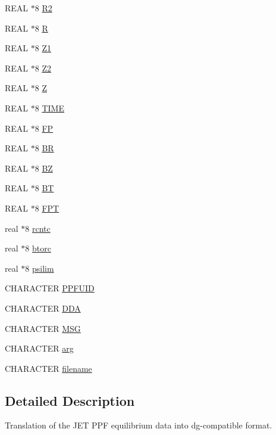 \begin{CompactItemize}
\item 
REAL $\ast$8 \hyperlink{namespaceJETPPF2DG_737ed75dab8a61babe35ac43c0a217e2}{R2}
\item 
REAL $\ast$8 \hyperlink{namespaceJETPPF2DG_e8aae9ece2ea51185b537f3815875dbe}{R}
\item 
REAL $\ast$8 \hyperlink{namespaceJETPPF2DG_b51d877f8345dc64e86952fa279daa83}{Z1}
\item 
REAL $\ast$8 \hyperlink{namespaceJETPPF2DG_dc17956d43608921538c64177125e1c4}{Z2}
\item 
REAL $\ast$8 \hyperlink{namespaceJETPPF2DG_e77dc9f382919eb823a6a004b79dec10}{Z}
\item 
REAL $\ast$8 \hyperlink{namespaceJETPPF2DG_c9078c3f7f6a9052eb87d78ea959db39}{TIME}
\item 
REAL $\ast$8 \hyperlink{namespaceJETPPF2DG_049a0aaf18dbe2243eb88e6b3098e4d3}{FP}
\item 
REAL $\ast$8 \hyperlink{namespaceJETPPF2DG_e35362876d621deef2d3119b6bec9e86}{BR}
\item 
REAL $\ast$8 \hyperlink{namespaceJETPPF2DG_caf852e3dca62b109e51b850e9a30668}{BZ}
\item 
REAL $\ast$8 \hyperlink{namespaceJETPPF2DG_1f8b39341692faac86ea6fbb52b03493}{BT}
\item 
REAL $\ast$8 \hyperlink{namespaceJETPPF2DG_697e63ef731b230d271dcbe3e66f07b2}{FPT}
\item 
real $\ast$8 \hyperlink{namespaceJETPPF2DG_be3c9bcf4058d9ec55ba6288bdef97fb}{rcntc}
\item 
real $\ast$8 \hyperlink{namespaceJETPPF2DG_b68b36ffa6613e3d1a69d435b2b5aaea}{btorc}
\item 
real $\ast$8 \hyperlink{namespaceJETPPF2DG_35264362cd8206b3671ba0049d7b3d5f}{psilim}
\item 
CHARACTER \hyperlink{namespaceJETPPF2DG_48577f770d2731f2e0b6560b4098131b}{PPFUID}
\item 
CHARACTER \hyperlink{namespaceJETPPF2DG_755c2f476cb350b1019df567507bd092}{DDA}
\item 
CHARACTER \hyperlink{namespaceJETPPF2DG_90aaa1a998c6e80c66375bf2e0f4cc2f}{MSG}
\item 
CHARACTER \hyperlink{namespaceJETPPF2DG_359c6fe9b150c29087e3c047ff7a6701}{arg}
\item 
CHARACTER \hyperlink{namespaceJETPPF2DG_9a2fec5fe980e03ddb99646d384a4d47}{filename}
\end{CompactItemize}


\subsection{Detailed Description}
Translation of the JET PPF equilibrium data into dg-compatible format. 

